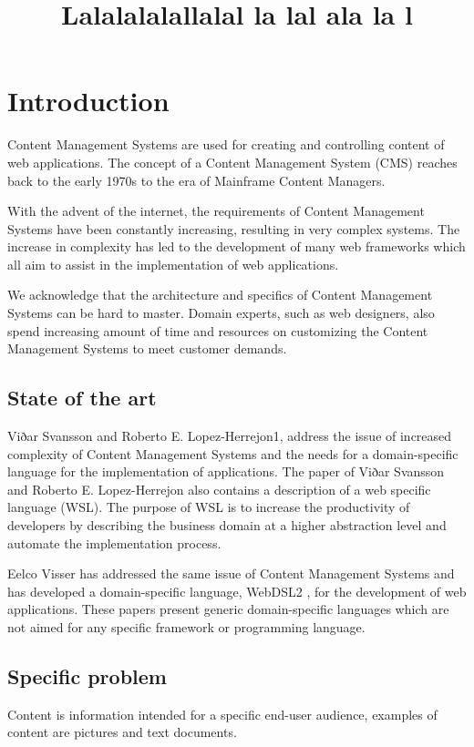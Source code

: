 \pagestyle{headings}  %


\title{Lalalalalallalal la lal ala la l}

\chapter*{Introduction}
Content Management Systems are used for creating and controlling content of web
applications. The concept of a Content Management System (CMS) reaches back to the
early 1970s to the era of Mainframe Content Managers.

With the advent of the internet, the requirements of Content Management Systems
have been constantly increasing, resulting in very complex systems. The increase in
complexity has led to the development of many web frameworks which all aim to assist
in the implementation of web applications.

We acknowledge that the architecture and specifics of Content Management Systems can
be hard to master. Domain experts, such as web designers, also spend increasing amount of
time and resources on customizing the Content Management Systems to meet customer demands.



\section*{State of the art}
Viðar Svansson and Roberto E. Lopez-Herrejon1, address the issue of increased complexity
of Content Management Systems and the needs for a domain-specific language for the
implementation of applications. The paper of Viðar Svansson and Roberto E. Lopez-Herrejon
also contains a description of a web specific language (WSL). The purpose of WSL is to increase
the productivity of developers by describing the business domain at a higher abstraction level
and automate the implementation process.

Eelco Visser has addressed the same issue of Content Management Systems and has developed a
domain-specific language, WebDSL2 , for the development of web applications. These papers
present generic domain-specific languages which are not aimed for any specific framework or
programming language.


\section*{Specific problem}
Content is information intended for a specific end-user audience, examples of
content are pictures and text documents.

